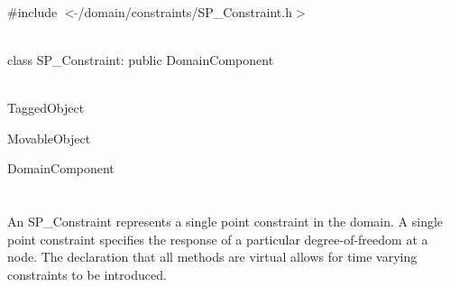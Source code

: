 
   \\
\#include $<\tilde{ }$/domain/constraints/SP\_Constraint.h$>$  


  \\
class SP\_Constraint: public DomainComponent 


 \\
TaggedObject 

MovableObject 

\indent\indent DomainComponent \\
\indent\indent{} \\

  \\
\indent An SP\_Constraint represents a single point constraint in the
domain. A single point constraint specifies the response of a particular
degree-of-freedom at a node. The declaration that all methods are
virtual allows for time varying constraints to be introduced. \\

